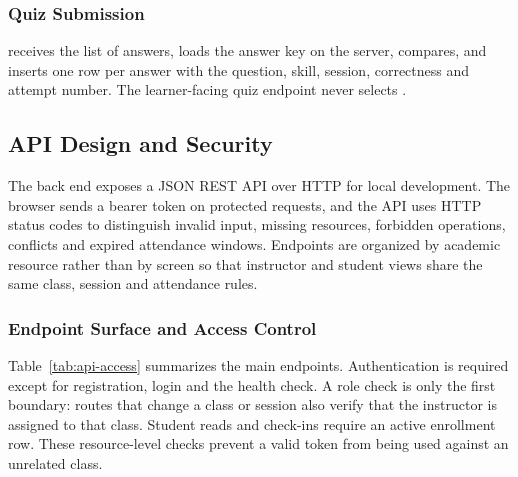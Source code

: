 \subsubsection{Quiz Submission}

 receives the list of answers, loads the answer key on the server, compares, and inserts one  row per answer with the question, skill, session, correctness and attempt number. The learner-facing quiz endpoint never selects .

\subsection{API Design and Security}
\label{sec:api-security}

The back end exposes a JSON REST API over HTTP for local development. The browser sends a bearer token on protected requests, and the API uses HTTP status codes to distinguish invalid input, missing resources, forbidden operations, conflicts and expired attendance windows. Endpoints are organized by academic resource rather than by screen so that instructor and student views share the same class, session and attendance rules.

\subsubsection{Endpoint Surface and Access Control}

Table~\ref{tab:api-access} summarizes the main endpoints. Authentication is required except for registration, login and the health check. A role check is only the first boundary: routes that change a class or session also verify that the instructor is assigned to that class. Student reads and check-ins require an active enrollment row. These resource-level checks prevent a valid token from being used against an unrelated class.

